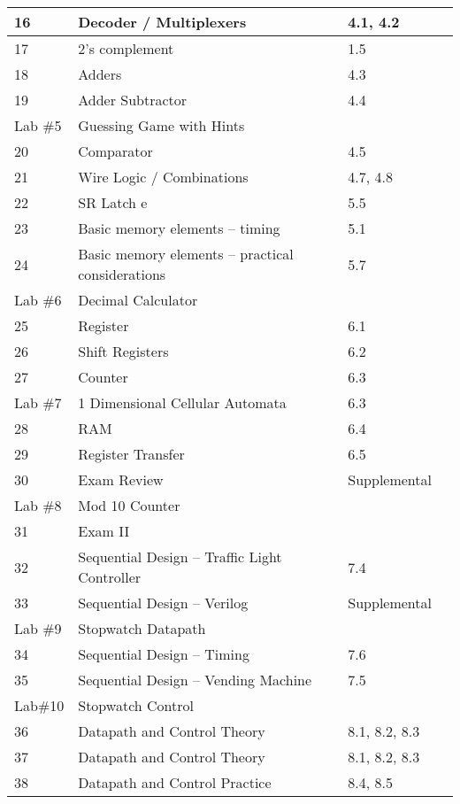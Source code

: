 \begin{longtable}{|l|m{7cm}|l|l|}
16 			& Decoder / Multiplexers  & 4.1, 4.2 \\ \hline
17 			& 2's complement  & 1.5 \\ \hline
18 			& Adders &  4.3 \\ \hline
19			& Adder Subtractor  & 4.4 \\ \hline
 \rowcolor{yellow} 
Lab \#5 	& Guessing Game with Hints  & \\ \hline
20			& Comparator &  4.5 \\ \hline
21			& Wire Logic / Combinations  & 4.7, 4.8 \\ \hline
22			& SR Latch e & 5.5 \\ \hline
23			& Basic memory elements -- timing  & 5.1 \\ \hline
24			& Basic memory elements -- practical considerations  & 5.7 \\ \hline
 \rowcolor{yellow} 
Lab \#6 	& Decimal Calculator & \\ \hline
25 			& Register &  6.1 \\ \hline
26 			& Shift Registers  & 6.2 \\ \hline
27 			& Counter &  6.3 \\ \hline
 \rowcolor{yellow} 
Lab \#7 	& 1 Dimensional Cellular Automata  & 6.3 \\ \hline
28 			& RAM &  6.4 \\ \hline
29 			& Register Transfer &  6.5 \\ \hline
30			& Exam Review &  Supplemental \\ \hline
 \rowcolor{yellow} 
Lab \#8 	& Mod 10 Counter &  \\ \hline
31			& Exam II &  \\ \hline
32 			& Sequential Design -- Traffic Light Controller  & 7.4 \\ \hline
33 			& Sequential Design -- Verilog  & Supplemental \\ \hline
 \rowcolor{yellow} 
Lab \#9 	& Stopwatch Datapath & \\ \hline
34 			& Sequential Design -- Timing  & 7.6 \\			 \hline
35 			& Sequential Design -- Vending Machine  & 7.5 \\ \hline
 \rowcolor{yellow} 
Lab\#10 	& Stopwatch Control  & \\ \hline
36 			& Datapath and Control Theory &  8.1, 8.2, 8.3 \\ \hline
37 			& Datapath and Control Theory  & 8.1, 8.2, 8.3 \\ \hline
38 			& Datapath and Control Practice  & 8.4, 8.5 \\ \hline

\end{longtable}
